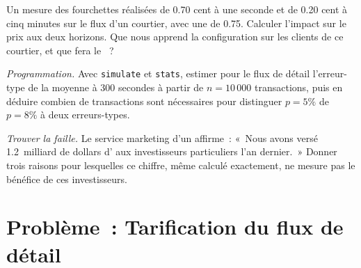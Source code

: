 \begin{exercise}[$\star\star$]\label{exo:m1:retail-flow-and-wholesaling:6}
Un  mesure des fourchettes réalisées de 0.70 cent à une seconde et de 0.20
cent à cinq minutes sur le flux d'un courtier, avec une  de
0.75. Calculer l'impact sur le prix aux deux horizons. Que nous apprend la configuration
sur les clients de ce courtier, et que fera le ~?
\end{exercise}

\begin{exercise}[$\star\star\star$]\label{exo:m1:retail-flow-and-wholesaling:7}
\emph{Programmation.} Avec \texttt{simulate} et \texttt{stats}, estimer pour le
flux de détail l'erreur-type de la  moyenne à 300
secondes à partir de $n = 10\,000$ transactions, puis en déduire combien de transactions sont nécessaires pour
distinguer $p = 5\%$ de $p = 8\%$ à deux erreurs-types.
\end{exercise}

\begin{exercise}[$\star\star\star$]\label{exo:m1:retail-flow-and-wholesaling:8}
\emph{Trouver la faille.} Le service marketing d'un  affirme~: «~Nous avons versé
1.2~milliard de dollars d' aux investisseurs particuliers l'an dernier.~» Donner trois
raisons pour lesquelles ce chiffre, même calculé exactement, ne mesure pas le
bénéfice de ces investisseurs.
\end{exercise}

\section{Problème~: Tarification du flux de détail}

